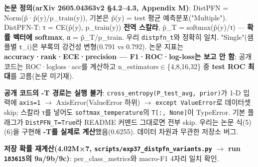 \par\noindent \textbullet\enspace \textbf{논문 정의(arXiv 2605.04363v2 §4.2–4.3, Appendix M)}: DistPFN =\allowbreak{} Norm(p̂·p̂(y)/\allowbreak{}p\_\allowbreak{}train(y)), 기본은 p̂(y) =\allowbreak{} test 평균 예측분포("Multiple"). DistPFN-T: τ =\allowbreak{} CE(p̂(y), p\_\allowbreak{}train(y)) \textbf{전역 스칼라}, p̂\_\allowbreak{}T =\allowbreak{} softmax(p̂(y)/\allowbreak{}τ) — \textbf{확률 벡터에 softmax}, α =\allowbreak{} p̂\_\allowbreak{}T/\allowbreak{}p\_\allowbreak{}train. 우리 \texttt{distpfn\_\allowbreak{}\allowbreak{}t}와 정확히 일치. "Single"(샘플별 τ\_\allowbreak{}i)은 부록의 강건성 변형(0.791 vs 0.792). 논문 지표는 \textbf{accuracy·rank·ECE·precision — F1·ROC·log-loss는 보고 안 함}; 공개 코드는 ROC·logloss·acc를 계산하고 n\_\allowbreak{}estimators\ensuremath{\in}\{4,8,16,32\} 중 \textbf{test ROC 최대}를 고름(논문 미기재).


\par\noindent \textbullet\enspace \textbf{공개 코드의 -T 경로는 실행 불가}: \texttt{cross\_\allowbreak{}\allowbreak{}en\allowbreak{}tropy(P\_\allowbreak{}\allowbreak{}test\_\allowbreak{}\allowbreak{}avg\allowbreak{},\allowbreak{} prior)\allowbreak{}}가 1-D 입력에 \texttt{axis=\allowbreak{}\allowbreak{}1}  \ensuremath{\rightarrow}  AxisError(ValueError 하위)  \ensuremath{\rightarrow}  \texttt{except V\allowbreak{}alueErro\allowbreak{}r}로 데이터셋 skip; 스칼라 τ를 넣어도 \texttt{softmax\_\allowbreak{}\allowbreak{}temperat\allowbreak{}ure}의 \texttt{T[:,\allowbreak{} Non\allowbreak{}e]}이 TypeError. 기본 플래그가 \texttt{DistPFN\_\allowbreak{}\allowbreak{}T=\allowbreak{}\allowbreak{}True}라 README 커맨드 그대로면 전부 skip. 우리는 논문 식(5)(6)을 구현해 \textbf{-T를 실제로 계산}했음(0.6255). 데이터 차원과 무관한 저장소 버그.


\par\noindent \textbullet\enspace \textbf{저장 확률 재계산(4.02M×7, \texttt{scripts/\allowbreak{}\allowbreak{}exp37\_\allowbreak{}\allowbreak{}di\allowbreak{}stpfn\_\allowbreak{}\allowbreak{}va\allowbreak{}riants.\allowbreak{}p\allowbreak{}y}  \ensuremath{\rightarrow}  run \texttt{183615}의 9a/\allowbreak{}9b/\allowbreak{}9c)}: per\_\allowbreak{}class\_\allowbreak{}metrics와 macro-F1 4자리 일치 확인.


